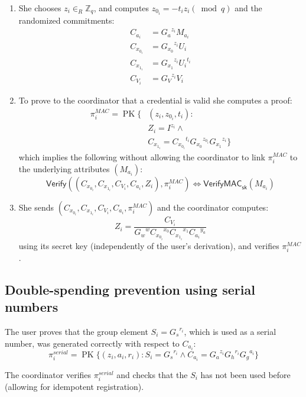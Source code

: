 \documentclass[a4paper]{article}
\begin{document}
\begin{enumerate}

\item She chooses
$z_i \in_{R} \mathbb{Z}_{q}$, and computes
$z_{0_i}=-{t_i} {z_i} (\bmod q)$
and the randomized commitments:
\begin{align*}
C_{a_i}     &= {G_a}^{z_i} M_{a_i} \\
C_{x_{0_i}} &= {G_{x_0}}^{z_i} {U_i} \\
C_{x_{1_i}} &= {G_{x_1}}^{z_i} {U_i}^{t_i} \\
C_{V_i}     &= {G_V}^{z_i} V_i
\end{align*}

\item To prove to the coordinator that a credential is valid she computes a proof:
\begin{align*}
\pi_{i}^{\mathit{MAC}}=\operatorname{PK}\{
& (z_i, z_{0_i},t_i): \\
& Z_i =I^{z_i} \land \\
& C_{x_{1_i}} = {C_{x_{0_i}}}^{t_i} {G_{x_0}}^{z_{0_i}} {G_{x_1}}^{z_i} \}
\end{align*}
which implies the following without allowing the coordinator to link $\pi_{i}^\mathit{MAC}$ to the underlying attributes $(M_{a_i})$:
\[
\mathsf{Verify}((C_{x_{0_i}}, C_{x_{1_i}}, C_{V_i}, C_{a_i}, Z_i), \pi_i^{\mathit{MAC}})
\iff
\mathsf{VerifyMAC}_{\mathsf{sk}}(M_{a_i})
\]

\item She sends $(C_{x_{0_i}}, C_{x_{1_i}}, C_{V_i}, C_{a_i},\pi_i^{\mathit{MAC}})$ and the coordinator computes:
\[
Z_i=\frac{C_{V_i}}{{G_w}^w {C_{x_{0_i}}}^{x_0} {C_{x_{1_i}}}^{x_{1}}
{C_{a_i}}^{y_a}
}
\]
using its secret key (independently of the user's derivation), and verifies $\pi_i^{\mathit{MAC}}$.

\end{enumerate}

\subsection{Double-spending prevention using serial numbers}\label{serial}

The user proves that the group element $S_i = {G_s}^{r_i}$, which is used as a serial number, was generated correctly with respect to $C_{a_i}$:
\[ \pi_{i}^{\mathit{serial}}=\operatorname{PK}\{ (z_i,a_i,r_i): S_i = {G_s}^{r_i} \land C_{a_i} = {G_a}^{z_i}{G_h}^{r_i}{G_g}^{a_i} \} \]

The coordinator verifies $\pi_{i}^{\mathit{serial}}$ and checks that the $S_i$ has not been used before (allowing for idempotent registration).
\end{document}
